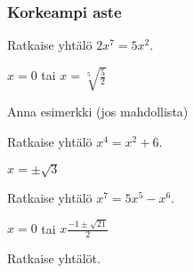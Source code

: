 \begin{tehtavasivu}

\subsubsection*{Korkeampi aste}


\begin{tehtava} 
Ratkaise yhtälö $2x^7=5x^2$.
    \begin{vastaus}
		$x=0$ tai $x=\sqrt[5]{\frac{5}{2}}$
    \end{vastaus}
\end{tehtava}

\begin{tehtava} 
Anna esimerkki (jos mahdollista)
    \begin{vastaus}
    \end{vastaus}
\end{tehtava}

\begin{tehtava} 
Ratkaise yhtälö $x^4=x^2+6$.
    \begin{vastaus}
		$x=\pm \sqrt{3}$
    \end{vastaus}
\end{tehtava}

\begin{tehtava} 
Ratkaise yhtälö
$x^7=5x^5-x^6$.
     \begin{vastaus}
		$x=0$ tai $x\frac{-1 \pm \sqrt{21}}{2}$ 
    \end{vastaus}
\end{tehtava}

\begin{tehtava}
    Ratkaise yhtälöt.
    \begin{vastaus}
    \end{vastaus}
\end{tehtava}



\end{tehtavasivu}
